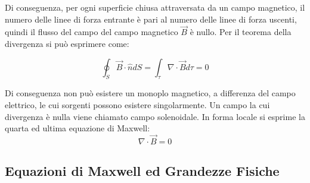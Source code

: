 \documentclass{article}
\numberwithin{equation}{subsection}
\begin{document}
\begin{center}
\end{center}

Di conseguenza, per ogni superficie chiusa attraversata da un campo magnetico, il numero delle linee di forza entrante è pari al numero delle linee di forza uscenti, quindi 
il flusso del campo del campo magnetico $\vec{B}$ è nullo. Per il teorema della divergenza si può esprimere come:

\begin{equation}
    \displaystyle\oint_{S}\vec{B}\cdot\hat{n}dS=\int_{\tau}\nabla\cdot\vec{B}d\tau=0
\end{equation}

Di conseguenza non può esistere un monoplo magnetico, a differenza del campo elettrico, le cui sorgenti possono esistere singolarmente. Un campo la cui divergenza è nulla 
viene chiamato campo solenoidale. In forma locale si esprime la quarta ed ultima equazione di Maxwell:
\begin{equation}
    \nabla\cdot\vec{B}=0
\end{equation}

\subsection{Equazioni di Maxwell ed Grandezze Fisiche}
\end{document}
